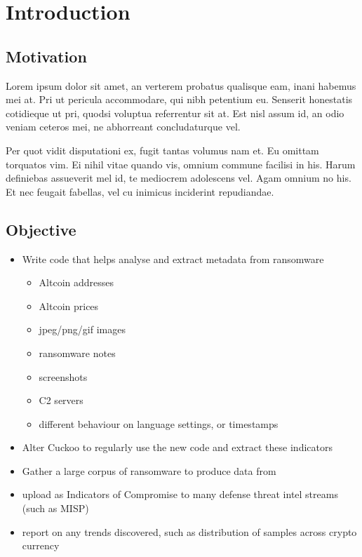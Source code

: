 \documentclass[11pt,fleqn]{book} %
\begin{document}
\pagestyle{fancy} %



\chapter{Introduction}

\section{Motivation}

Lorem ipsum dolor sit amet, an verterem probatus qualisque eam, inani habemus mei at. Pri ut pericula accommodare, qui nibh petentium eu. Senserit honestatis cotidieque ut pri, quodsi voluptua referrentur sit at. Est nisl assum id, an odio veniam ceteros mei, ne abhorreant concludaturque vel.

Per quot vidit disputationi ex, fugit tantas volumus nam et. Eu omittam torquatos vim. Ei nihil vitae quando vis, omnium commune facilisi in his. Harum definiebas assueverit mel id, te mediocrem adolescens vel. Agam omnium no his. Et nec feugait fabellas, vel cu inimicus inciderint repudiandae.

\section{Objective}

\begin{itemize}
\item Write code that helps analyse and extract metadata from ransomware
\begin{itemize}
\item Altcoin addresses
\item Altcoin prices
\item jpeg/png/gif images
\item ransomware notes
\item screenshots
\item C2 servers
\item different behaviour on language settings, or timestamps
\end{itemize}
\item Alter Cuckoo to regularly use the new code and extract these indicators
\item Gather a large corpus of ransomware to produce data from
\item upload as Indicators of Compromise to many defense threat intel streams (such as MISP)
\item report on any trends discovered, such as distribution of samples across crypto currency
\end{itemize}
\end{document}
